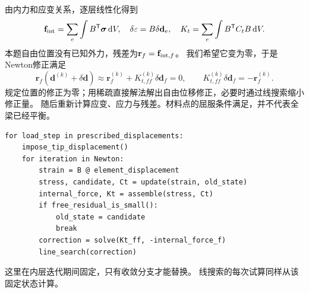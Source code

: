 \documentclass[UTF8,a4paper,fontset=fandol,10pt]{ctexart}
\newcommand{\dd}{\mathop{}\!\mathrm{d}}
\newcommand{\code}[1]{\texttt{\detokenize{#1}}}
\begin{document}
由内力和应变关系，逐层线性化得到
\[
\mathbf f_{\rm int}=\sum_e\int B^{\mathsf T}\boldsymbol\sigma\dd V,
\quad \delta\varepsilon=B\delta\mathbf d_e,
\quad K_t=\sum_e\int B^{\mathsf T}C_tB\dd V.
\]
本题自由位置没有已知外力，残差为$\mathbf r_f=\mathbf f_{{\rm int},f}$。
我们希望它变为零，于是Newton修正满足
\[
\mathbf r_f(\mathbf d^{(k)}+\delta\mathbf d)
\approx\mathbf r_f^{(k)}+K_{t,ff}^{(k)}\delta\mathbf d_f=0,
\qquad K_{t,ff}^{(k)}\delta\mathbf d_f=-\mathbf r_f^{(k)}.
\]
规定位置的修正为零；用稀疏直接解法解出自由位移修正，必要时通过线搜索缩小修正量。
随后重新计算应变、应力与残差。材料点的屈服条件满足，并不代表全梁已经平衡。

\noindent\begin{minipage}{\linewidth}
\begin{lstlisting}
for load_step in prescribed_displacements:
    impose_tip_displacement()
    for iteration in Newton:
        strain = B @ element_displacement
        stress, candidate, Ct = update(strain, old_state)
        internal_force, Kt = assemble(stress, Ct)
        if free_residual_is_small():
            old_state = candidate
            break
        correction = solve(Kt_ff, -internal_force_f)
        line_search(correction)
\end{lstlisting}
\end{minipage}
这里\code{old_state}在内层迭代期间固定，只有收敛分支才能替换。
线搜索的每次试算同样从该固定状态计算。
\end{document}
